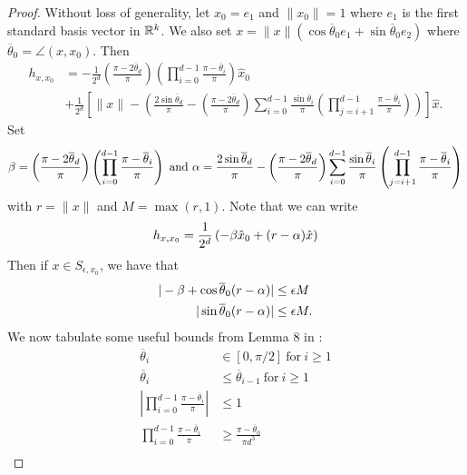 \documentclass{article}
\begin{document}
\begin{proof}
Without loss of generality, let $x_0 = e_1$ and $\|x_0\| = 1$ where $e_1$ is the first standard basis vector in $\mathbb{R}^{k}$. We also set $x = \|x\|\left(\cos \overline{\theta}_0 e_1 + \sin \overline{\theta}_0 e_2\right)$ where $\overline{\theta}_0 = \angle(x,x_0)$. Then \begin{align*}
h_{x,x_0} & = - \frac{1}{2^d}\left(\frac{\pi - 2\overline{\theta}_d}{\pi}\right)\left(\prod_{i=0}^{d-1}\frac{\pi - \overline{\theta}_i}{\pi}\right)\hat{x}_0 \\
& + \frac{1}{2^d}\left[\|x\| - \left( \frac{2\sin \overline{\theta}_d}{\pi} - \left(\frac{\pi - 2\overline{\theta}_d}{\pi}\right) \sum_{i=0}^{d-1} \frac{\sin \overline{\theta}_i}{\pi}\left(\prod_{j=i+1}^{d-1} \frac{\pi - \overline{\theta}_i}{\pi}\right)\right)\right]\hat{x}.
\end{align*} Set \begin{align*}
\beta = \left(\frac{\pi - 2\overline{\theta}_d}{\pi}\right)\left(\prod_{i=0}^{d-1}\frac{\pi - \overline{\theta}_i}{\pi}\right)\ \text{and}\ \alpha = \frac{2\sin \overline{\theta}_d}{\pi} - \left(\frac{\pi - 2\overline{\theta}_d}{\pi}\right) \sum_{i=0}^{d-1} \frac{\sin \overline{\theta}_i}{\pi}\left(\prod_{j=i+1}^{d-1} \frac{\pi - \overline{\theta}_i}{\pi}\right)
\end{align*} with $r = \|x\|$ and $M = \max(r,1)$. Note that we can write \begin{align*}
h_{x,x_0} = \frac{1}{2^d}\left(-\beta \hat{x}_0 + (r - \alpha)\hat{x}\right)
\end{align*} Then if $x \in S_{\epsilon,x_0}$, we have that \begin{align}
|-\beta + \cos \overline{\theta}_0 (r - \alpha)| & \leq \epsilon M \label{cosleqM} \\
|\sin \overline{\theta}_0(r - \alpha)| & \leq \epsilon M. \label{sinleqM}
\end{align} We now tabulate some useful bounds from Lemma 8 in \cite{Hand2017}: \begin{align}
\overline{\theta}_i & \in [0,\pi/2]\ \text{for}\ i \geq 1 \\
\overline{\theta}_i & \leq \overline{\theta}_{i-1}\ \text{for}\ i \geq 1 \\ 
\left|\prod_{i=0}^{d-1}\frac{\pi - \overline{\theta}_i}{\pi}\right| & \leq 1 \label{piprod_upperbound}\\
\prod_{i=0}^{d-1}\frac{\pi - \overline{\theta}_i}{\pi} & \geq \frac{\pi - \overline{\theta}_0}{\pi d^3} \label{piprod_lowerbound}\\

\end{align}
\end{proof}
\end{document}

